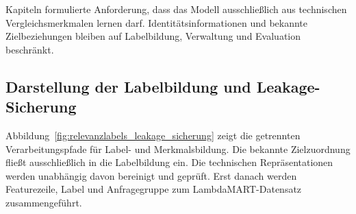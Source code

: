 Kapiteln formulierte Anforderung, dass das Modell ausschließlich aus technischen Vergleichsmerkmalen lernen darf. Identitätsinformationen und bekannte Zielbeziehungen bleiben auf Labelbildung, Verwaltung und Evaluation beschränkt. \subsection{Darstellung der Labelbildung und Leakage-Sicherung} \label{subsec:darstellung_labels_leakage} Abbildung~\ref{fig:relevanzlabels_leakage_sicherung} zeigt die getrennten Verarbeitungspfade für Label- und Merkmalsbildung. Die bekannte Zielzuordnung fließt ausschließlich in die Labelbildung ein. Die technischen Repräsentationen werden unabhängig davon bereinigt und geprüft. Erst danach werden Featurezeile, Label und Anfragegruppe zum LambdaMART-Datensatz zusammengeführt.

